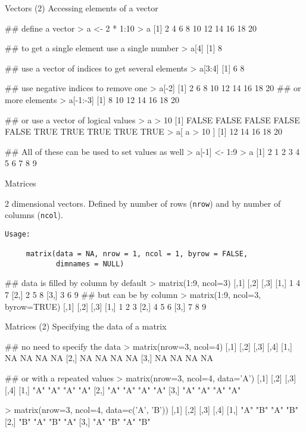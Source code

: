 \documentclass[pdf]{beamer}
\begin{document}
\begin{frame}[fragile]{Vectors (2)}
Accessing elements of a vector

\begin{rcode}
  ## define a vector
  > a <- 2 * 1:10
  > a
  [1]  2  4  6  8 10 12 14 16 18 20

  ## to get a single element use a single number
  > a[4]
  [1] 8

  ## use a vector of indices to get several elements
  > a[3:4]
  [1] 6 8
  
  ## use negative indices to remove one
  > a[-2]
  [1]  2  6  8 10 12 14 16 18 20
  ## or more elements
  > a[-1:-3]
  [1]  8 10 12 14 16 18 20
  
  ## or use a vector of logical values
  > a > 10
  [1] FALSE FALSE FALSE FALSE FALSE  TRUE  TRUE  TRUE  TRUE  TRUE
  > a[ a > 10 ]
  [1] 12 14 16 18 20

  ## All of these can be used to set values as well
  > a[-1] <- 1:9
  > a
  [1] 2 1 2 3 4 5 6 7 8 9
\end{rcode}
\end{frame}

\begin{frame}[fragile]{Matrices}
  
  { \small
  2 dimensional vectors. Defined by number of rows (\texttt{nrow})
  and by number of columns (\texttt{ncol}).

  \begin{verbatim}
Usage:

     matrix(data = NA, nrow = 1, ncol = 1, byrow = FALSE,
            dimnames = NULL)
\end{verbatim}
}
  \begin{rcode}
    ## data is filled by column by default
    > matrix(1:9, ncol=3)
         [,1] [,2] [,3]
    [1,]    1    4    7
    [2,]    2    5    8
    [3,]    3    6    9
    ## but can be by column
    > matrix(1:9, ncol=3, byrow=TRUE)
         [,1] [,2] [,3]
    [1,]    1    2    3
    [2,]    4    5    6
    [3,]    7    8    9

  \end{rcode}
\end{frame}

\begin{frame}[fragile]{Matrices (2)}
  Specifying the data of a matrix

  \begin{rcode}
    ## no need to specify the data
    > matrix(nrow=3, ncol=4)
         [,1] [,2] [,3] [,4]
    [1,]   NA   NA   NA   NA
    [2,]   NA   NA   NA   NA
    [3,]   NA   NA   NA   NA

    ## or with a repeated values
    > matrix(nrow=3, ncol=4, data='A')
        [,1] [,2] [,3] [,4]
    [1,] "A"  "A"  "A"  "A" 
    [2,] "A"  "A"  "A"  "A" 
    [3,] "A"  "A"  "A"  "A" 

    > matrix(nrow=3, ncol=4, data=c('A', 'B'))
        [,1] [,2] [,3] [,4]
    [1,] "A"  "B"  "A"  "B" 
    [2,] "B"  "A"  "B"  "A" 
    [3,] "A"  "B"  "A"  "B" 

  \end{rcode}

\end{frame}
\end{document}

